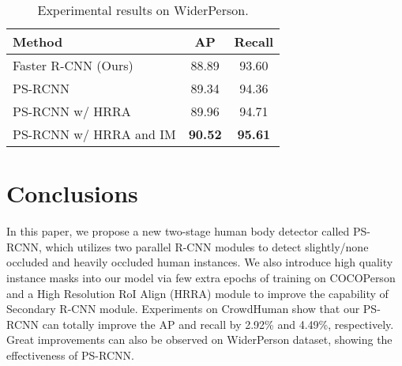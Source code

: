 \documentclass{article}
\begin{document}
\begin{table}[!h]
\caption{Experimental results on WiderPerson.}
\centering
\begin{tabular}{l|cc}
\hline
Method                 & AP    & Recall \\ \hline
Faster R-CNN (Ours)    & 88.89 & 93.60  \\ \hline
PS-RCNN                & 89.34 & 94.36  \\
PS-RCNN w/ HRRA        & 89.96 & 94.71  \\
PS-RCNN w/ HRRA and IM & \textbf{90.52} & \textbf{95.61}  \\ \hline
\end{tabular}\label{widerperson}
\vspace{-0.4cm}
\end{table}

\section{Conclusions}

In this paper, we propose a new two-stage human body detector called PS-RCNN, which utilizes two parallel R-CNN modules to detect slightly/none occluded and heavily occluded human instances. We also introduce high quality instance masks into our model via few extra epochs of training on COCOPerson and a High Resolution RoI Align (HRRA) module to improve the capability of Secondary R-CNN module. Experiments on CrowdHuman show that our PS-RCNN can totally improve the AP and recall by 2.92\% and 4.49\%, respectively. Great improvements can also be observed on WiderPerson dataset, showing the effectiveness of PS-RCNN.



\end{document}
